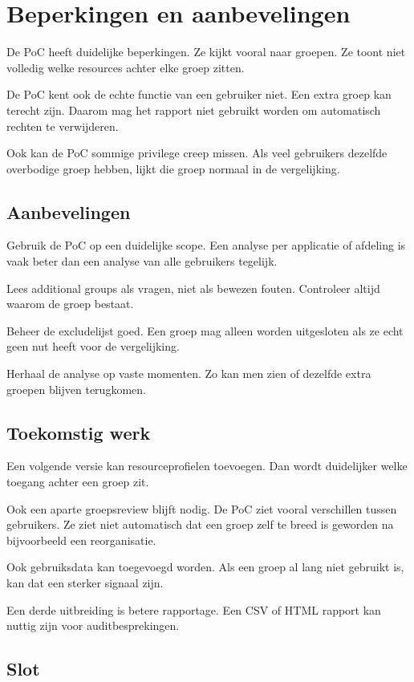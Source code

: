\section{Beperkingen en aanbevelingen}

De PoC heeft duidelijke beperkingen. Ze kijkt vooral naar groepen. Ze toont niet volledig welke resources achter elke groep zitten.

De PoC kent ook de echte functie van een gebruiker niet. Een extra groep kan terecht zijn. Daarom mag het rapport niet gebruikt worden om automatisch rechten te verwijderen.

Ook kan de PoC sommige privilege creep missen. Als veel gebruikers dezelfde overbodige groep hebben, lijkt die groep normaal in de vergelijking.

\subsection*{Aanbevelingen}

Gebruik de PoC op een duidelijke scope. Een analyse per applicatie of afdeling is vaak beter dan een analyse van alle gebruikers tegelijk.

Lees additional groups als vragen, niet als bewezen fouten. Controleer altijd waarom de groep bestaat.

Beheer de excludelijst goed. Een groep mag alleen worden uitgesloten als ze echt geen nut heeft voor de vergelijking.

Herhaal de analyse op vaste momenten. Zo kan men zien of dezelfde extra groepen blijven terugkomen.

\subsection*{Toekomstig werk}

Een volgende versie kan resourceprofielen toevoegen. Dan wordt duidelijker welke toegang achter een groep zit.

Ook een aparte groepsreview blijft nodig. De PoC ziet vooral verschillen tussen gebruikers. Ze ziet niet automatisch dat een groep zelf te breed is geworden na bijvoorbeeld een reorganisatie.

Ook gebruiksdata kan toegevoegd worden. Als een groep al lang niet gebruikt is, kan dat een sterker signaal zijn.

Een derde uitbreiding is betere rapportage. Een CSV of HTML rapport kan nuttig zijn voor auditbesprekingen.

\subsection*{Slot}

